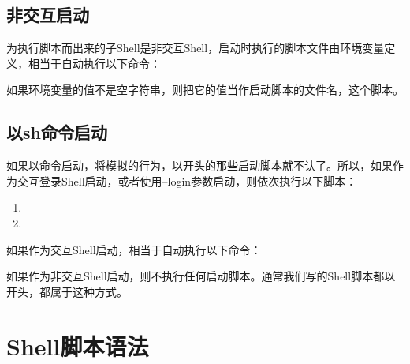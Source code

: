 \subsection{非交互启动}
%


为执行脚本而出来的子Shell是非交互Shell，启动时执行的脚本文件由环境变量定义，相当于自动执行以下命令：




如果环境变量的值不是空字符串，则把它的值当作启动脚本的文件名，这个脚本。


\subsection{以sh命令启动}
%


如果以命令启动，将模拟的行为，以开头的那些启动脚本就不认了。所以，如果作为交互登录Shell启动，或者使用--login参数启动，则依次执行以下脚本：


\begin{enumerate}

\item {}

\item {}
\end{enumerate}


如果作为交互Shell启动，相当于自动执行以下命令：




如果作为非交互Shell启动，则不执行任何启动脚本。通常我们写的Shell脚本都以开头，都属于这种方式。




\section{Shell脚本语法}
%
